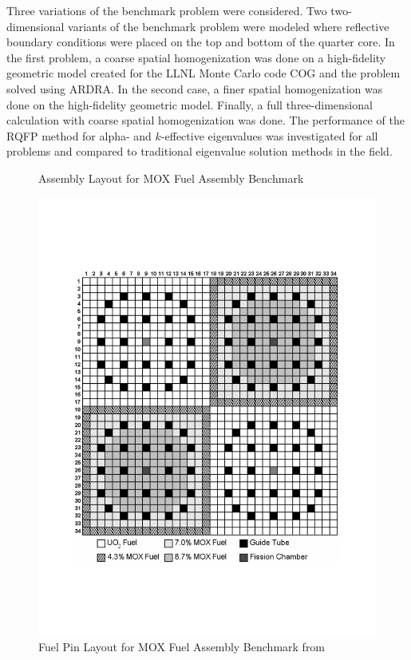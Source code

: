 Three variations of the benchmark problem were considered. Two two-dimensional variants of the benchmark problem were modeled where reflective boundary conditions were placed on the top and bottom of the quarter core. In the first problem, a coarse spatial homogenization was done on a high-fidelity geometric model created for the LLNL Monte Carlo code COG \cite{buck1993cog} and the problem solved using ARDRA. In the second case, a finer spatial homogenization was done on the high-fidelity geometric model. Finally, a full three-dimensional calculation with coarse spatial homogenization was done. The performance of the RQFP method for alpha- and $k$-effective eigenvalues was investigated for all problems and compared to traditional eigenvalue solution methods in the field.

\begin{figure}[!htbp]
\centering
\resizebox{0.55\textwidth}{!}{
	
	}
	\caption{Assembly Layout for MOX Fuel Assembly Benchmark}
	\label{fig:CoreConfig}
\end{figure}

\begin{figure}[!htbp]
\centering
  \includegraphics[trim=2cm 4cm 2cm 4cm,clip=true,width=.55\linewidth]{Figures/HigherDimEigen/FuelPinAssembly}
\caption{Fuel Pin Layout for MOX Fuel Assembly Benchmark from \cite{lewis2001benchmark}}
  \label{fig:FuelPinAssembly}
\end{figure}

